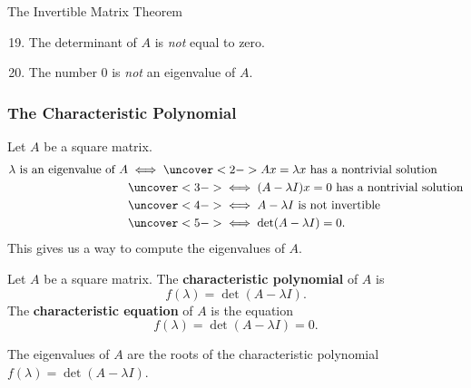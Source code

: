 \begin{frame}
\begin{oneoffthm}{The Invertible Matrix Theorem}
{}\par\vskip-1mm
  \begin{enumerate}
    \setcounter{enumi}{18}
    \pause
  \item The determinant of $A$ is \emph{not} equal to zero.
    \pause
  \item The number $0$ is \emph{not} an eigenvalue of $A$.
  \end{enumerate}
\end{oneoffthm}

\end{frame}



\begin{frame}
\frametitle{The Characteristic Polynomial}

Let $A$ be a square matrix.
\[\begin{split}
  \text{$\lambda$ is an eigenvalue of $A$}
  &\iff\uncover<2->{Ax=\lambda x \text{ has a nontrivial solution}} \\
  &\uncover<3->{\iff (A-\lambda I)x = 0  \text{ has a nontrivial solution}} \\
  &\uncover<4->{\iff A-\lambda I \text{ is not invertible}} \\
  &\uncover<5->{\iff \det(A-\lambda I) = 0.}
\end{split}\]
\pause[6]%
This gives us a way to compute the eigenvalues of $A$.

\pause\medskip
\begin{defn}
  Let $A$ be a square matrix.  The \textbf{characteristic polynomial} of $A$ is
  \[ f(\lambda) = \det(A-\lambda I). \]
  \pause
  The \textbf{characteristic equation} of $A$ is the equation
  \[ f(\lambda) = \det(A-\lambda I) = 0. \]
\end{defn}

\pause
\begin{bluebox}[Important]{.7\linewidth}
  The eigenvalues of $A$ are the roots of the characteristic polynomial
  $f(\lambda) = \det(A-\lambda I)$.
\end{bluebox}

\end{frame}


